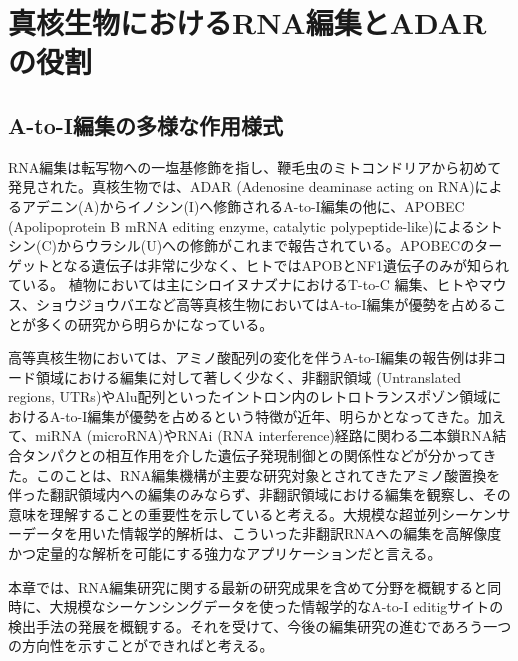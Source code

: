 \newpage

\section{真核生物におけるRNA編集とADARの役割}
\subsection{A-to-I編集の多様な作用様式}
RNA編集は転写物への一塩基修飾を指し、鞭毛虫のミトコンドリアから初めて発見された。真核生物では、ADAR (Adenosine deaminase acting on RNA)によるアデニン(A)からイノシン(I)へ修飾されるA-to-I編集の他に、APOBEC (Apolipoprotein B mRNA editing enzyme, catalytic polypeptide-like)によるシトシン(C)からウラシル(U)への修飾がこれまで報告されている。APOBECのターゲットとなる遺伝子は非常に少なく、ヒトではAPOBとNF1遺伝子のみが知られている。
植物においては主にシロイヌナズナにおけるT-to-C 編集、ヒトやマウス、ショウジョウバエなど高等真核生物においてはA-to-I編集が優勢を占めることが多くの研究から明らかになっている。
\par
高等真核生物においては、アミノ酸配列の変化を伴うA-to-I編集の報告例は非コード領域における編集に対して著しく少なく、非翻訳領域 (Untranslated regions, UTRs)やAlu配列といったイントロン内のレトロトランスポゾン領域におけるA-to-I編集が優勢を占めるという特徴が近年、明らかとなってきた。加えて、miRNA (microRNA)やRNAi (RNA interference)経路に関わる二本鎖RNA結合タンパクとの相互作用を介した遺伝子発現制御との関係性などが分かってきた。このことは、RNA編集機構が主要な研究対象とされてきたアミノ酸置換を伴った翻訳領域内への編集のみならず、非翻訳領域における編集を観察し、その意味を理解することの重要性を示していると考える。大規模な超並列シーケンサーデータを用いた情報学的解析は、こういった非翻訳RNAへの編集を高解像度かつ定量的な解析を可能にする強力なアプリケーションだと言える。
\par
本章では、RNA編集研究に関する最新の研究成果を含めて分野を概観すると同時に、大規模なシーケンシングデータを使った情報学的なA-to-I editigサイトの検出手法の発展を概観する。それを受けて、今後の編集研究の進むであろう一つの方向性を示すことができればと考える。

